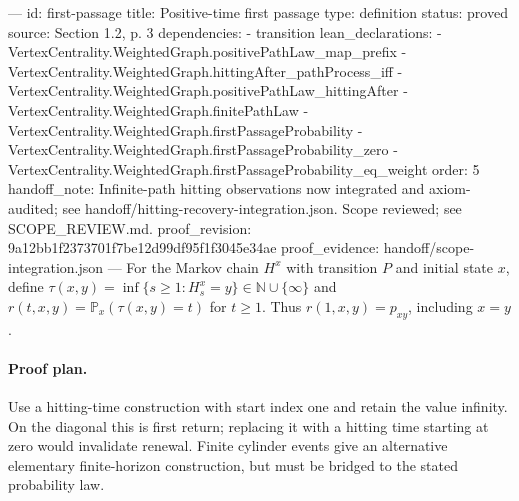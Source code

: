 ---
id: first-passage
title: Positive-time first passage
type: definition
status: proved
source: Section 1.2, p. 3
dependencies:
- transition
lean_declarations:
- VertexCentrality.WeightedGraph.positivePathLaw_map_prefix
- VertexCentrality.WeightedGraph.hittingAfter_pathProcess_iff
- VertexCentrality.WeightedGraph.positivePathLaw_hittingAfter
- VertexCentrality.WeightedGraph.finitePathLaw
- VertexCentrality.WeightedGraph.firstPassageProbability
- VertexCentrality.WeightedGraph.firstPassageProbability_zero
- VertexCentrality.WeightedGraph.firstPassageProbability_eq_weight
order: 5
handoff_note: Infinite-path hitting observations now integrated and axiom-audited; see handoff/hitting-recovery-integration.json. Scope reviewed; see SCOPE_REVIEW.md.
proof_revision: 9a12bb1f2373701f7be12d99df95f1f3045e34ae
proof_evidence: handoff/scope-integration.json
---
For the Markov chain $H^x$ with transition $P$ and initial state $x$, define $\tau(x,y)=\inf\{s\geq1:H_s^x=y\}\in\mathbb N\cup\{\infty\}$ and $r(t,x,y)=\mathbb P_x(\tau(x,y)=t)$ for $t\geq1$. Thus $r(1,x,y)=p_{xy}$, including $x=y$.

\paragraph{Proof plan.}
Use a hitting-time construction with start index one and retain the value infinity. On the diagonal this is first return; replacing it with a hitting time starting at zero would invalidate renewal. Finite cylinder events give an alternative elementary finite-horizon construction, but must be bridged to the stated probability law.
